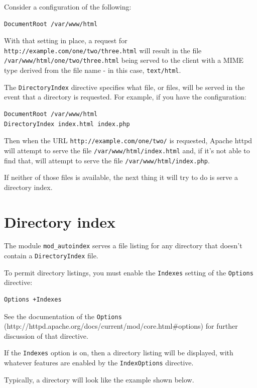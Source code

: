 Consider a configuration of the following:

\begin{verbatim}
DocumentRoot /var/www/html
\end{verbatim}

With that setting in place, a request for \verb~http://example.com/one/two/three.html~ will result in the file \verb~/var/www/html/one/two/three.html~ being served to the client with a MIME type derived from the file name - in this case, \verb~text/html~.

The \verb~DirectoryIndex~ directive specifies what file, or files, will be served in the event that a directory is requested. For example, if you have the configuration:

\begin{verbatim}
DocumentRoot /var/www/html
DirectoryIndex index.html index.php
\end{verbatim}

Then when the URL \verb~http://example.com/one/two/~ is requested, Apache httpd will attempt to serve the file \verb~/var/www/html/index.html~ and, if it's not able to find that, will attempt to serve the file \verb~/var/www/html/index.php~.

If neither of those files is available, the next thing it will try to do is serve a directory index.

\section{Directory index}
\label{autoindex}

The module \verb~mod_autoindex~ serves a file listing for any directory that doesn't contain a \verb~DirectoryIndex~ file.

To permit directory listings, you must enable the \verb~Indexes~ setting of the \verb~Options~ directive:

\begin{verbatim}
Options +Indexes
\end{verbatim}

See the documentation of the \verb~Options~ (http://httpd.apache.org/docs/current/mod/core.html\#options) for further discussion of that directive.

If the \verb~Indexes~ option is on, then a directory listing will be displayed, with whatever features are enabled by the \verb~IndexOptions~ directive.

Typically, a directory will look like the example shown below.

